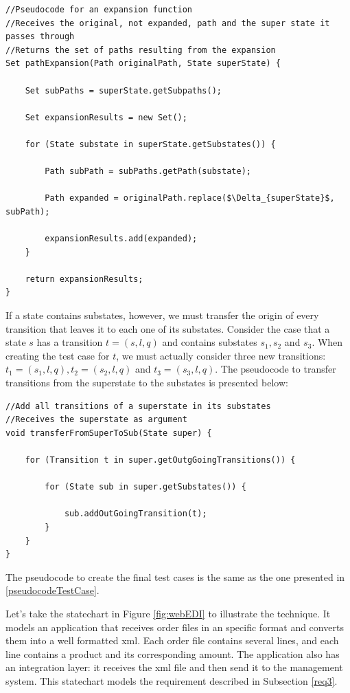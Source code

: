 \begin{lstlisting}[mathescape,caption={Expansion psseudocode for a path that passes through a superstate}]
//Pseudocode for an expansion function
//Receives the original, not expanded, path and the super state it passes through
//Returns the set of paths resulting from the expansion
Set pathExpansion(Path originalPath, State superState) {
		
	Set subPaths = superState.getSubpaths();

	Set expansionResults = new Set();

	for (State substate in superState.getSubstates()) {
		
		Path subPath = subPaths.getPath(substate);

		Path expanded = originalPath.replace($\Delta_{superState}$, subPath);

		expansionResults.add(expanded);
	}

	return expansionResults;
}

\end{lstlisting}

If a state contains substates, however, we must transfer the origin of every transition that leaves it to each one of its substates. Consider the case that a state $s$ has a transition $t = (s,l,q)$ and contains substates $s_1, s_2$ and $s_3$. When creating the test case for $t$, we must actually consider three new transitions: $t_1 = (s_1,l,q), t_2 = (s_2,l,q)$ and $t_3 = (s_3,l,q)$. The pseudocode to transfer transitions from the superstate to the substates is presented below:

\begin{lstlisting}[caption={Pseudocode to transfer transitions from a superstate to its substates}]
//Add all transitions of a superstate in its substates
//Receives the superstate as argument
void transferFromSuperToSub(State super) {
	
	for (Transition t in super.getOutgGoingTransitions()) {
		
		for (State sub in super.getSubstates()) {
			
			sub.addOutGoingTransition(t);
		}
	}
}

\end{lstlisting}

The pseudocode to create the final test cases is the same as the one presented in \ref{pseudocodeTestCase}.

Let's take the statechart in Figure \ref{fig:webEDI} to illustrate the technique. It models an application that receives order files in an specific format and converts them into a well formatted xml. Each order file contains several lines, and each line contains a product and its corresponding amount. The application also has an integration layer: it receives the xml file and then send it to the management system. This statechart models the requirement described in Subsection \ref{req3}.

